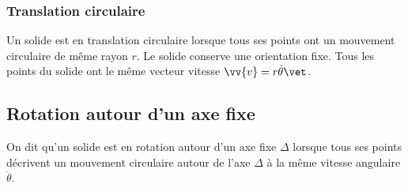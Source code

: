 \documentclass{cours}
\begin{document}
\subsubsection{Translation circulaire}%
\label{ssub:translation_circulaire}

\begin{definition}
  Un solide est en translation circulaire lorsque tous ses points ont un mouvement circulaire de même rayon $r$. Le solide conserve une orientation fixe. Tous les points du solide ont le même vecteur vitesse $\vv{v} = r \dot{\theta}\vet$.  
\end{definition}

\begin{center}
\end{center}

\subsection{Rotation autour d'un axe fixe}%
\label{sub:rotation_autour_d_un_axe_fixe}

\begin{definition}
  On dit qu'un solide est en rotation autour d'un axe fixe $\Delta$ lorsque tous ses points décrivent un mouvement circulaire autour de l'axe $\Delta$ à la même vitesse angulaire $\dot{\theta}$.  
\end{definition}

\begin{center}
\end{center}
\end{document}
